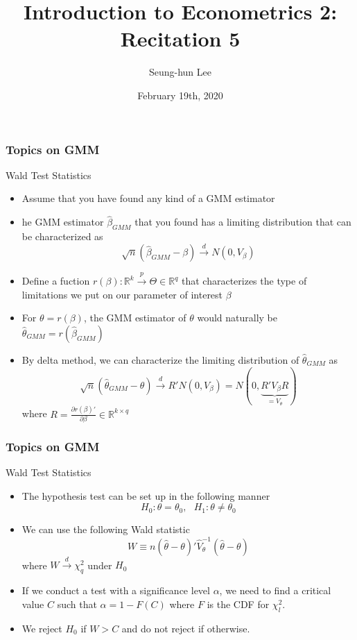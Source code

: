 \documentclass{beamer}
\title[Econometrics 2]{Introduction to Econometrics 2: Recitation 5} %
\author{Seung-hun Lee}
\institute{Columbia University}
\date{February 19th, 2020}
\begin{document}
\begin{frame}
\titlepage
\end{frame}


\begin{frame}
\frametitle{Topics on GMM}
Wald Test Statistics
\begin{itemize}
\item Assume that you have found any kind of a GMM estimator
\item he GMM estimator $\hat{\beta}_{GMM}$ that you found has a limiting distribution that can be characterized as
\[
\sqrt{n}(\hat{\beta}_{GMM}-\beta)\xrightarrow{d}N(0,V_\beta)
\]
\item Define a fuction $r(\beta):\mathbb{R}^k\xrightarrow{p} \Theta\in\mathbb{R}^q$ that characterizes the type of limitations we put on our parameter of interest $\beta$
\item For $\theta=r(\beta)$, the GMM estimator of $\theta$ would naturally be $\hat{\theta}_{GMM}=r(\hat{\beta}_{GMM})$
\item By delta method, we can characterize the limiting distribution of $\hat{\theta}_{GMM}$ as
\[
\sqrt{n}(\hat{\theta}_{GMM}-\theta)\xrightarrow{d}R'N(0,V_\beta) = N(0,\underbrace{R'V_\beta R}_{=V_\theta})
\]
where $R = \frac{\partial r(\beta)'}{\partial \beta}\in\mathbb{R}^{k\times q}$
\end{itemize}
\end{frame}


\begin{frame}
\frametitle{Topics on GMM}
Wald Test Statistics
\begin{itemize}
\item The hypothesis test can be set up in the following manner
\[
H_0 : \theta= \theta_0, \ \ \ H_1 : \theta \neq \theta_0
\]
\item We can use the following Wald statistic
\[
W\equiv n(\hat{\theta}-\theta)'\widehat{V}_{\theta}^{-1} (\hat{\theta}-\theta)
\]
where $W\xrightarrow{d}\chi_q^2$ under $H_0$
\item If we conduct a test with a significance level $\alpha$, we need to find a critical value $C$ such that $\alpha=1-F(C)$ where $F$ is the CDF for $\chi^2_{l}$.
\item We reject $H_0$ if $W>C$ and do not reject if otherwise.
\end{itemize}
\end{frame}
\end{document}
